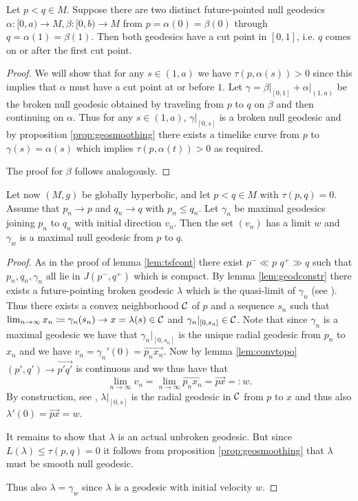 \begin{lemma}
Let $p<q\in M$. Suppose there are two distinct future-pointed null geodesics $\alpha:[0,a)\to M, \beta:[0,b)\to M$ from $p=\alpha(0)=\beta(0)$ through $q=\alpha(1)=\beta(1)$. Then both geodesics have a cut point in $[0,1]$, i.e. $q$ comes on or after the first cut point.
\end{lemma}
\begin{proof}
We will show that for any $s\in (1,a)$ we have $\tau(p,\alpha(s))>0$ since this implies that $\alpha$ must have a cut point at or before $1$. Let $\gamma=\beta\rvert_{[0,1]}+\alpha\rvert_{(1,a)}$ be the broken null geodesic obtained by traveling from $p$ to $q$ on $\beta$ and then continuing on $\alpha$. Thus for any $s\in(1,a)$, $\gamma\rvert_{[0,s]}$ is a broken null geodesic and by proposition \ref{prop:geosmoothing} there exists a timelike curve from $p$ to $\gamma(s)=\alpha(s)$ which implies $\tau(p,\alpha(t))>0$ as required.

The proof for $\beta$ follows analogously.
\end{proof}



\begin{lemma}\label{lem:cutlemma}
Let now $(M,g)$ be globally hyperbolic, and let $p<q\in M$ with $\tau(p,q)=0$. Assume that $p_n\to p$ and $q_n \to q$ with $p_n\leq q_n$. Let $\gamma_n$ be maximal geodesics joining $p_n$ to $q_n$ with initial direction $v_n$. Then the set $(v_n)$ has a limit $w$ and $\gamma_w$ is a maximal null geodesic from $p$ to $q$. 
\end{lemma}
\begin{proof}
As in the proof of lemma \ref{lem:tsfcont} there exist $p^-\ll p$ $q^+\gg q$ such that $p_n,q_n,\gamma_n$ all lie in $J(p^-,q^+)$ which is compact. By lemma \ref{lem:geodconstr} there exists a future-pointing broken geodesic $\lambda$ which is the quasi-limit of $\gamma_n$ (see \cite[Def. 14.7]{oneill}). Thus there exists a convex neighborhood $\mathcal{C}$ of $p$ and a sequence $s_n$ such that $\lim_{n\to\infty} x_n\coloneqq\gamma_n(s_n)\to x=\lambda(s) \in \mathcal{C}$ and $\gamma_n\rvert_{[0,s_n]}\in \mathcal{C}$. Note that since $\gamma_n$ is a maximal geodesic we have that $\gamma_n\rvert_{[0,s_n]}$ is the unique radial geodesic from $p_n$ to $x_n$ and we have $v_n=\gamma_n'(0) = \overrightarrow{p_nx_n}$. Now by lemma \ref{lem:convtopo} $(p',q')\to \overrightarrow{p'q'}$ is continuous and we thus have that 
\[
\lim_{n\to \infty}v_n = \lim_{n\to \infty}\overrightarrow{p_nx_n} = \overrightarrow{px} =: w.
\]
By construction, see \cite[Lemma 14.14]{oneill}, $\lambda\rvert_{[0,s]}$ is the radial geodesic in $\mathcal{C}$ from $p$ to $x$ and thus also $\lambda'(0) =\overrightarrow{px}= w$.

It remains to show that $\lambda$ is an actual unbroken geodesic. But since $L(\lambda)\leq \tau(p,q) = 0$ it follows from proposition \ref{prop:geosmoothing} that $\lambda$ must be smooth null geodesic.

Thus also $\lambda = \gamma_w$ since $\lambda$ is a geodesic with initial velocity $w$.
\end{proof}


